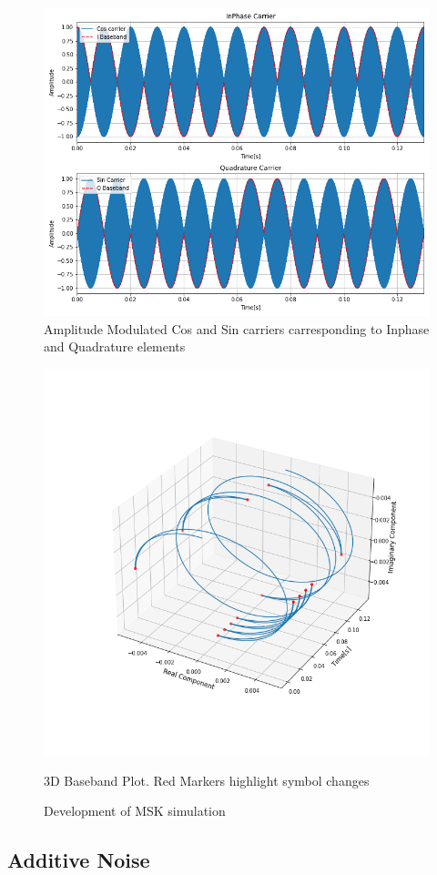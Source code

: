 \begin{figure}[h!]
    \centering
    \includegraphics[width = \textwidth]{figs/sim/carrier.png}
    \caption{\centering Amplitude Modulated Cos and Sin carriers carresponding to Inphase and Quadrature elements}
    \label{fig:carrier}
\end{figure}
\begin{figure}[h!]
    \centering
    \includegraphics[height = \textwidth]{figs/sim/3dbaseband.png}
    \caption{3D Baseband Plot. \small{Red Markers highlight symbol changes}}
    \label{fig:3DBB}
    \caption{Development of MSK simulation}
\end{figure}

\subsection{Additive Noise}